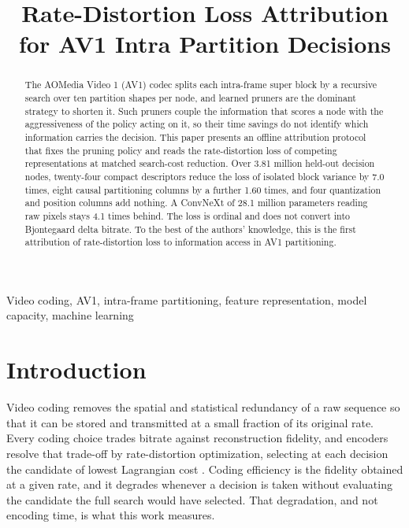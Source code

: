\documentclass{article}
\title{Rate-Distortion Loss Attribution for AV1 Intra Partition Decisions}
\begin{document}
\ninept

\maketitle

\begin{abstract}
The AOMedia Video 1 (AV1) codec splits each intra-frame super block by a
recursive search over ten partition shapes per node, and learned pruners are the
dominant strategy to shorten it. Such pruners couple the information that scores
a node with the aggressiveness of the policy acting on it, so their time savings
do not identify which information carries the decision. This paper presents an
offline attribution protocol that fixes the pruning policy and reads the
rate-distortion loss of competing representations at matched search-cost
reduction. Over 3.81 million held-out decision nodes, twenty-four compact
descriptors reduce the loss of isolated block variance by 7.0 times, eight causal
partitioning columns by a further 1.60 times, and four quantization and position
columns add nothing. A ConvNeXt of 28.1 million parameters reading raw pixels
stays 4.1 times behind. The loss is ordinal and does not convert into Bjontegaard
delta bitrate. To the best of the authors' knowledge, this is the first
attribution of rate-distortion loss to information access in AV1 partitioning.
\end{abstract}

\begin{keywords}
Video coding, AV1, intra-frame partitioning, feature representation, model
capacity, machine learning
\end{keywords}

\section{Introduction}
\label{sec:intro}

Video coding removes the spatial and statistical redundancy of a raw sequence so
that it can be stored and transmitted at a small fraction of its original rate.
Every coding choice trades bitrate against reconstruction fidelity, and encoders
resolve that trade-off by rate-distortion optimization, selecting at each
decision the candidate of lowest Lagrangian cost \cite{sullivan1998}. Coding
efficiency is the fidelity obtained at a given rate, and it degrades whenever a
decision is taken without evaluating the candidate the full search would have
selected. That degradation, and not encoding time, is what this work measures.
\end{document}
